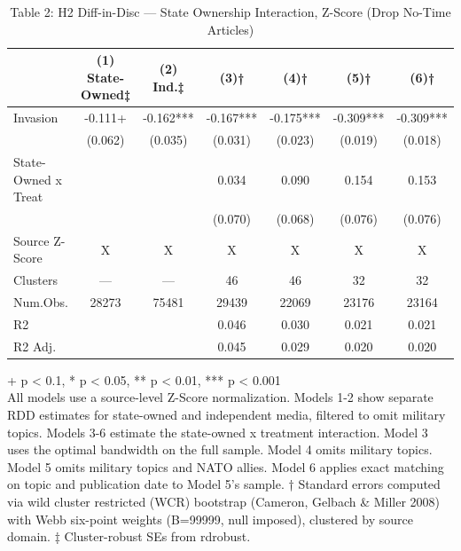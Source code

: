 \begin{table}[t]
\caption{\label{tab:table-02}Table 2: H2 Diff-in-Disc — State Ownership Interaction, Z-Score (Drop No-Time Articles)} 
\fontsize{12.0pt}{14.0pt}\selectfont
\begin{tabular*}{\linewidth}{@{\extracolsep{\fill}}lcccccc}
\toprule
  & (1) State-Owned‡ & (2) Ind.‡ & (3)† & (4)† & (5)† & (6)† \\ 
\midrule\addlinespace[2.5pt]
Invasion & -0.111+ & -0.162*** & -0.167*** & -0.175*** & -0.309*** & -0.309*** \\ 
 & (0.062) & (0.035) & (0.031) & (0.023) & (0.019) & (0.018) \\ 
State-Owned x Treat &  &  & 0.034 & 0.090 & 0.154 & 0.153 \\ 
{} & {} & {} & {(0.070)} & {(0.068)} & {(0.076)} & {(0.076)} \\ 
Source Z-Score & X & X & X & X & X & X \\ 
Clusters & — & — & 46 & 46 & 32 & 32 \\ 
Num.Obs. & 28273 & 75481 & 29439 & 22069 & 23176 & 23164 \\ 
R2 &  &  & 0.046 & 0.030 & 0.021 & 0.021 \\ 
R2 Adj. &  &  & 0.045 & 0.029 & 0.020 & 0.020 \\ 
\bottomrule
\end{tabular*}
\begin{minipage}{\linewidth}
\vspace{.05em}
+ p < 0.1, * p < 0.05, ** p < 0.01, *** p < 0.001\\
All models use a source-level Z-Score normalization. Models 1-2 show separate
RDD estimates for state-owned and independent media, filtered to omit military
topics. Models 3-6 estimate the state-owned x treatment interaction. Model 3
uses the optimal bandwidth on the full sample. Model 4 omits military topics.
Model 5 omits military topics and NATO allies. Model 6 applies exact matching on
topic and publication date to Model 5's sample. † Standard errors computed via
wild cluster restricted (WCR) bootstrap (Cameron, Gelbach \& Miller 2008) with
Webb six-point weights (B=99999, null imposed), clustered by source domain. ‡
Cluster-robust SEs from rdrobust.\\
\end{minipage}
\end{table}

